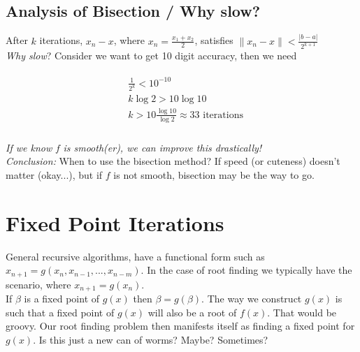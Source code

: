 \documentclass[paper=a4, fontsize=11pt]{scrartcl} %
\numberwithin{equation}{section} %
\numberwithin{figure}{section} %
\numberwithin{table}{section} %
\begin{document}
\subsection{Analysis of Bisection / Why slow?}

$ $\\

After $k$ iterations, $x_n - x$, where $x_n = \frac{x_1+x_2}{2}$,  satisfies $\| x_n - x\| < \frac{ |b-a| } {2^{k+1}}$ \\

\emph{Why slow}? Consider we want to get 10 digit accuracy, then we need 

\begin{align} 
\nonumber
\begin{split}
& \frac{1}{2^k} < 10^{-10}\\
&k \log 2 > 10 \log 10\\
&k > 10 \frac{\log 10}{\log 2} \approx 33 \mbox{ iterations} \\
\end{split}					
\end{align}

\emph{If we know} $f$ \emph{is smooth(er), we can improve this drastically!} \\

\emph{Conclusion:} When to use the bisection method? If speed (or cuteness) doesn't matter (okay...), but if $f$ is not smooth, bisection may be the way to go. \\




%
%

\section{Fixed Point Iterations}

$ $\\

General recursive algorithms, have a functional form such as $x_{n+1} = g(x_n, x_{n-1},...,x_{n-m})$. In the case of root finding we typically have the scenario, where $x_{n+1} = g(x_n)$. \\

If $\beta$ is a fixed point of $g(x)$ then $\beta = g(\beta)$. The way we construct $g(x)$ is such that a fixed point of $g(x)$ will also be a root of $f(x)$. That would be groovy. Our root finding problem then manifests itself as finding a fixed point for $g(x)$. Is this just a new can of worms? Maybe? Sometimes? \\
\end{document}
